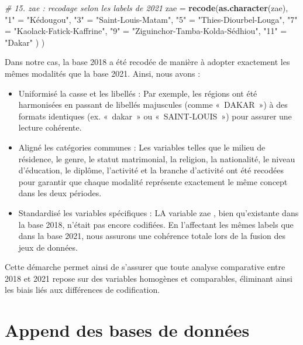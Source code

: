 \documentclass[
]{article}
\newenvironment{Shaded}{\begin{snugshade}}{\end{snugshade}}
\newcommand{\AttributeTok}[1]{\textcolor[rgb]{0.13,0.29,0.53}{#1}}
\newcommand{\CommentTok}[1]{\textcolor[rgb]{0.56,0.35,0.01}{\textit{#1}}}
\newcommand{\FunctionTok}[1]{\textcolor[rgb]{0.13,0.29,0.53}{\textbf{#1}}}
\newcommand{\NormalTok}[1]{#1}
\newcommand{\OtherTok}[1]{\textcolor[rgb]{0.56,0.35,0.01}{#1}}
\newcommand{\StringTok}[1]{\textcolor[rgb]{0.31,0.60,0.02}{#1}}
\begin{document}
\begin{Shaded}
\begin{Highlighting}[]
    \CommentTok{\# 15. zae : recodage selon les labels de 2021}
    \AttributeTok{zae =} \FunctionTok{recode}\NormalTok{(}\FunctionTok{as.character}\NormalTok{(zae),}
      \StringTok{"1"}  \OtherTok{=} \StringTok{"Kédougou"}\NormalTok{,}
      \StringTok{"3"}  \OtherTok{=} \StringTok{"Saint{-}Louis{-}Matam"}\NormalTok{,}
      \StringTok{"5"}  \OtherTok{=} \StringTok{"Thies{-}Diourbel{-}Louga"}\NormalTok{,}
      \StringTok{"7"}  \OtherTok{=} \StringTok{"Kaolack{-}Fatick{-}Kaffrine"}\NormalTok{,}
      \StringTok{"9"}  \OtherTok{=} \StringTok{"Ziguinchor{-}Tamba{-}Kolda{-}Sédhiou"}\NormalTok{,}
      \StringTok{"11"} \OtherTok{=} \StringTok{"Dakar"}
\NormalTok{    )}
\NormalTok{  )}
\end{Highlighting}
\end{Shaded}

Dans notre cas, la base 2018 a été recodée de manière à adopter
exactement les mêmes modalités que la base 2021. Ainsi, nous avons :

\begin{itemize}
\item
  Uniformisé la casse et les libellés : Par exemple, les régions ont été
  harmonisées en passant de libellés majuscules (comme «~DAKAR~») à des
  formats identiques (ex. «~dakar~» ou «~SAINT-LOUIS~») pour assurer une
  lecture cohérente.
\item
  Aligné les catégories communes : Les variables telles que le milieu de
  résidence, le genre, le statut matrimonial, la religion, la
  nationalité, le niveau d'éducation, le diplôme, l'activité et la
  branche d'activité ont été recodées pour garantir que chaque modalité
  représente exactement le même concept dans les deux périodes.
\item
  Standardisé les variables spécifiques : LA variable zae , bien
  qu'existante dans la base 2018, n'était pas encore codifiées. En
  l'affectant les mêmes labels que dans la base 2021, nous assurons une
  cohérence totale lors de la fusion des jeux de données.
\end{itemize}

Cette démarche permet ainsi de s'assurer que toute analyse comparative
entre 2018 et 2021 repose sur des variables homogènes et comparables,
éliminant ainsi les biais liés aux différences de codification.

\hypertarget{append-des-bases-de-donnuxe9es}{%
\section{Append des bases de
données}\label{append-des-bases-de-donnuxe9es}}
\end{document}
